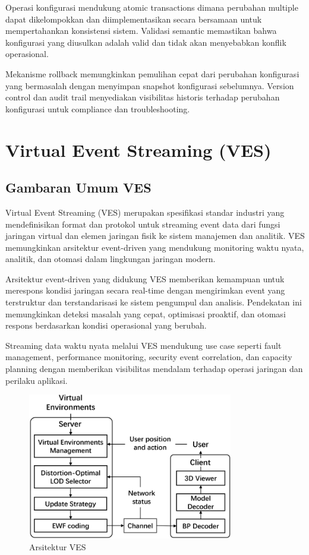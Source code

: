 Operasi konfigurasi mendukung atomic transactions dimana perubahan multiple dapat dikelompokkan dan diimplementasikan secara bersamaan untuk mempertahankan konsistensi sistem. Validasi semantic memastikan bahwa konfigurasi yang diusulkan adalah valid dan tidak akan menyebabkan konflik operasional.

Mekanisme rollback memungkinkan pemulihan cepat dari perubahan konfigurasi yang bermasalah dengan menyimpan snapshot konfigurasi sebelumnya. Version control dan audit trail menyediakan visibilitas historis terhadap perubahan konfigurasi untuk compliance dan troubleshooting.

\section{Virtual Event Streaming (VES)}

\subsection{Gambaran Umum VES}

Virtual Event Streaming (VES) merupakan spesifikasi standar industri yang mendefinisikan format dan protokol untuk streaming event data dari fungsi jaringan virtual dan elemen jaringan fisik ke sistem manajemen dan analitik. VES memungkinkan arsitektur event-driven yang mendukung monitoring waktu nyata, analitik, dan otomasi dalam lingkungan jaringan modern.

Arsitektur event-driven yang didukung VES memberikan kemampuan untuk merespons kondisi jaringan secara real-time dengan mengirimkan event yang terstruktur dan terstandarisasi ke sistem pengumpul dan analisis. Pendekatan ini memungkinkan deteksi masalah yang cepat, optimisasi proaktif, dan otomasi respons berdasarkan kondisi operasional yang berubah.

Streaming data waktu nyata melalui VES mendukung use case seperti fault management, performance monitoring, security event correlation, dan capacity planning dengan memberikan visibilitas mendalam terhadap operasi jaringan dan perilaku aplikasi.

\begin{figure}[h]
    \centering
    \includegraphics[width=0.8\textwidth]{assets/pics/bab3_16.png}
    \caption{Arsitektur VES}
    \label{fig:ves_architecture}
\end{figure}

